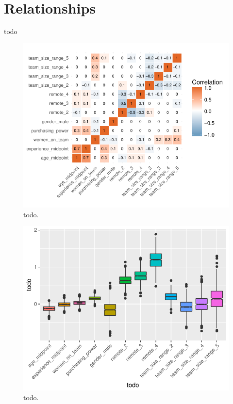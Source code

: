 \documentclass{article}
\begin{document}
\section{Relationships}
todo





\begin{figure}[H]
\centering
\includegraphics{report-024}
\caption{todo.}\label{fig_6}
\end{figure}


\begin{figure}[H]
\centering
\includegraphics{report-026}
\caption{todo.}\label{fig_7}
\end{figure}
\end{document}
